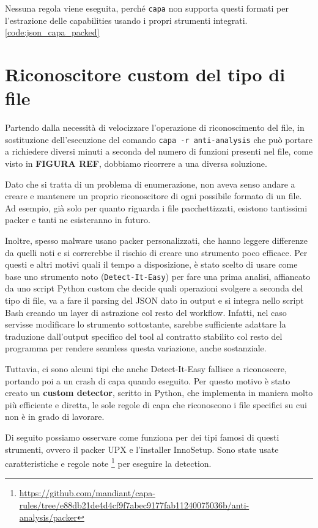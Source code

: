Nessuna regola viene eseguita, perché \texttt{capa} non supporta questi formati per l'estrazione delle capabilities usando i propri strumenti integrati. \ref{code:json_capa_packed}

\section{Riconoscitore custom del tipo di file}
Partendo dalla necessità di velocizzare l'operazione di riconoscimento del file, in sostituzione dell'esecuzione del comando \texttt{capa -r anti-analysis} che può portare a richiedere diversi minuti a seconda del numero di funzioni presenti nel file, come visto in \textbf{FIGURA REF},
dobbiamo ricorrere a una diversa soluzione.

Dato che si tratta di un problema di enumerazione, non aveva senso andare a creare e mantenere un proprio riconoscitore di ogni possibile formato di un file. Ad esempio, già solo per quanto riguarda i file pacchettizzati, esistono tantissimi packer e tanti ne esisteranno in futuro.

Inoltre, spesso malware usano packer personalizzati, che hanno leggere differenze da quelli noti e si correrebbe il rischio di creare uno strumento poco efficace.
Per questi e altri motivi quali il tempo a disposizione, è stato scelto di usare come base uno strumento noto (\texttt{Detect-It-Easy}) per fare una prima analisi, affiancato da uno script Python custom che decide quali operazioni svolgere a seconda del tipo di file, va a fare il parsing del JSON dato in output e si integra nello script Bash creando un layer di astrazione col resto del workflow.
Infatti, nel caso servisse modificare lo strumento sottostante, sarebbe sufficiente adattare la traduzione dall'output specifico del tool al contratto stabilito col resto del programma per rendere seamless questa variazione, anche sostanziale.

Tuttavia, ci sono alcuni tipi che anche Detect-It-Easy fallisce a riconoscere, portando poi a un crash di capa quando eseguito.
Per questo motivo è stato creato un \textbf{custom detector}, scritto in Python, che implementa in maniera molto più efficiente e diretta, le sole regole di capa che riconoscono i file specifici su cui non è in grado di lavorare.

Di seguito possiamo osservare come funziona per dei tipi famosi di questi strumenti, ovvero il packer UPX e l'installer InnoSetup.
Sono state usate caratteristiche e regole note
\footnote{\url{https://github.com/mandiant/capa-rules/tree/e88db21de4d4cf9f7abec9177fab11240075036b/anti-analysis/packer}}
per eseguire la detection.

